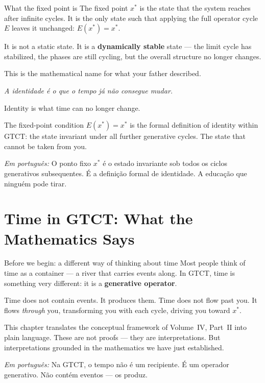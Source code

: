 \documentclass[12pt, openright]{book}
\theoremstyle{definition}
\theoremstyle{remark}
\begin{document}
\begin{studentbox}{What the fixed point is}
The fixed point $x^*$ is the state that the system reaches
after infinite cycles. It is the only state such that
applying the full operator cycle $E$ leaves it unchanged:
$E(x^*) = x^*$.

It is not a static state. It is a \textbf{dynamically stable} state ---
the limit cycle has stabilized, the phases are still cycling,
but the overall structure no longer changes.

This is the mathematical name for what your father described.

\textit{A identidade é o que o tempo já não consegue mudar.}

Identity is what time can no longer change.

The fixed-point condition $E(x^*) = x^*$ is the formal definition
of identity within GTCT: the state invariant under all further
generative cycles. The state that cannot be taken from you.

\textit{Em português:}
O ponto fixo $x^*$ é o estado invariante sob todos os ciclos
generativos subsequentes. É a definição formal de identidade.
A educação que ninguém pode tirar.
\end{studentbox}

\chapter{Time in GTCT: What the Mathematics Says}
\label{ch:time}

\begin{studentbox}{Before we begin: a different way of thinking about time}
Most people think of time as a container --- a river that
carries events along. In GTCT, time is something very different:
it is a \textbf{generative operator}.

Time does not contain events. It produces them.
Time does not flow past you. It flows \textit{through} you,
transforming you with each cycle, driving you toward $x^*$.

This chapter translates the conceptual framework of
Volume~IV, Part~II into plain language. These are not
proofs --- they are interpretations. But interpretations
grounded in the mathematics we have just established.

\textit{Em português:}
Na GTCT, o tempo não é um recipiente. É um operador generativo.
Não contém eventos --- os produz.
\end{studentbox}
\end{document}
